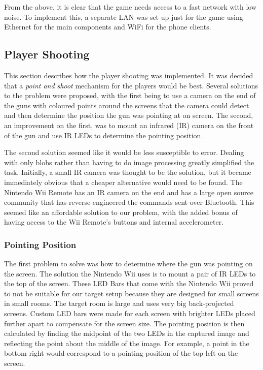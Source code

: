\documentclass[a4paper,11pt]{article}
\begin{document}
From the above, it is clear that the game needs access to a fast network with low noise. To implement this, a separate LAN was set up just for the game using Ethernet for the main components and WiFi for the phone clients.

\subsection{Player Shooting}

This section describes how the player shooting was implemented. It was decided that a \emph{point and shoot} mechanism for the players would be best. Several solutions to the problem were proposed, with the first being to use a camera on the end of the guns with coloured points around the screens that the camera could detect and then determine the position the gun was pointing at on screen. The second, an improvement on the first, was to mount an infrared (IR) camera on the front of the gun and use IR LEDs to determine the pointing position. 

The second solution seemed like it would be less susceptible to error. Dealing with only blobs rather than having to do image processing greatly simplified the task. Initially, a small IR camera was thought to be the solution, but it became immediately obvious that a cheaper alternative would need to be found. The Nintendo Wii Remote has an IR camera on the end and has a large open source community that has reverse-engineered the commands sent over Bluetooth\cite{wiibrew_wiimote}. This seemed like an affordable solution to our problem, with the added bonus of having access to the Wii Remote's buttons and internal accelerometer. 

\subsubsection{Pointing Position}
The first problem to solve was how to determine where the gun was pointing on the screen. The solution the Nintendo Wii uses is to mount a pair of IR LEDs to the top of the screen. These LED Bars that come with the Nintendo Wii proved to not be suitable for our target setup because they are designed for small screens in small rooms. The target room is large and uses very big back-projected screens. Custom LED bars were made for each screen with brighter LEDs placed further apart to compensate for the screen size. The pointing position is then calculated by finding the midpoint of the two LEDs in the captured image and reflecting the point about the middle of the image. For example, a point in the bottom right would correspond to a pointing position of the top left on the screen.
\end{document}
